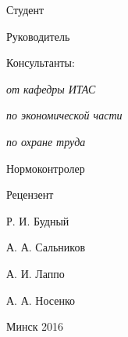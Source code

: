 \begin{minipage}{.6\textwidth}
Студент

Руководитель

Консультанты:

\hspace{0.3em} \textit{от кафедры ИТАС}

\hspace{0.3em} \textit{по экономической части}

\hspace{0.3em} \textit{по охране труда}

Нормоконтролер

\smallskip
Рецензент
\end{minipage}
\hfill
\begin{minipage}{.3\textwidth}
  Р. И. Будный

  А. А. Сальников

  \vspace{\baselineskip}
  А. И. Лаппо

  А. А. Носенко

  \color{red}{???}

  \color{red}{???}

  \smallskip
  \color{red}{???}
\end{minipage}

\vfill

{\centering{}
  Минск 2016\par
}

\setlength{\parindent}{1.25cm} %
